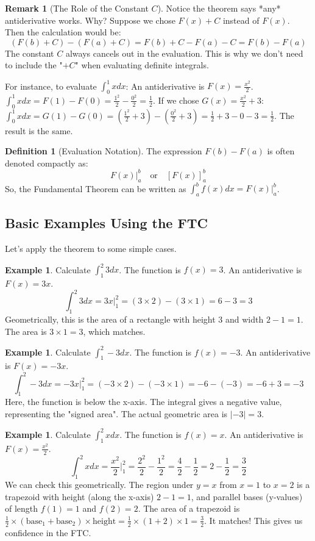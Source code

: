 \documentclass[11pt]{article}
\theoremstyle{definition}
\newtheorem{definition}[theorem]{Definition}
\newtheorem{example}[theorem]{Example}
\newtheorem{remark}[theorem]{Remark}
\theoremstyle{remark} %
\begin{document}
\begin{remark}[The Role of the Constant $C$]
Notice the theorem says *any* antiderivative works. Why? Suppose we chose $F(x) + C$ instead of $F(x)$. Then the calculation would be:
\[
(F(b) + C) - (F(a) + C) = F(b) + C - F(a) - C = F(b) - F(a)
\]
The constant $C$ always cancels out in the evaluation. This is why we don't need to include the "$+ C$" when evaluating definite integrals.

For instance, to evaluate $\int_0^1 x dx$:
An antiderivative is $F(x) = \frac{x^2}{2}$.
$\int_0^1 x dx = F(1) - F(0) = \frac{1^2}{2} - \frac{0^2}{2} = \frac{1}{2}$.
If we chose $G(x) = \frac{x^2}{2} + 3$:
$\int_0^1 x dx = G(1) - G(0) = (\frac{1^2}{2} + 3) - (\frac{0^2}{2} + 3) = \frac{1}{2} + 3 - 0 - 3 = \frac{1}{2}$.
The result is the same.
\end{remark}

\begin{definition}[Evaluation Notation]
The expression $F(b) - F(a)$ is often denoted compactly as:
\[
F(x) \bigg|_a^b \quad \text{or} \quad [F(x)]_a^b
\]
So, the Fundamental Theorem can be written as $\int_a^b f(x) dx = F(x) \big|_a^b$.
\end{definition}

\subsection{Basic Examples Using the FTC}

Let's apply the theorem to some simple cases.

\begin{example}
Calculate $\int_1^2 3 dx$.
The function is $f(x) = 3$. An antiderivative is $F(x) = 3x$.
\[
\int_1^2 3 dx = 3x \bigg|_1^2 = (3 \times 2) - (3 \times 1) = 6 - 3 = 3
\]
Geometrically, this is the area of a rectangle with height 3 and width $2-1=1$. The area is $3 \times 1 = 3$, which matches.
\end{example}

\begin{example}
Calculate $\int_1^2 -3 dx$.
The function is $f(x) = -3$. An antiderivative is $F(x) = -3x$.
\[
\int_1^2 -3 dx = -3x \bigg|_1^2 = (-3 \times 2) - (-3 \times 1) = -6 - (-3) = -6 + 3 = -3
\]
Here, the function is below the x-axis. The integral gives a negative value, representing the "signed area". The actual geometric area is $|-3|=3$.
\end{example}

\begin{example}
Calculate $\int_1^2 x dx$.
The function is $f(x) = x$. An antiderivative is $F(x) = \frac{x^2}{2}$.
\[
\int_1^2 x dx = \frac{x^2}{2} \bigg|_1^2 = \frac{2^2}{2} - \frac{1^2}{2} = \frac{4}{2} - \frac{1}{2} = 2 - \frac{1}{2} = \frac{3}{2}
\]
We can check this geometrically. The region under $y=x$ from $x=1$ to $x=2$ is a trapezoid with height (along the x-axis) $2-1=1$, and parallel bases (y-values) of length $f(1)=1$ and $f(2)=2$. The area of a trapezoid is $\frac{1}{2} \times (\text{base}_1 + \text{base}_2) \times \text{height} = \frac{1}{2} \times (1+2) \times 1 = \frac{3}{2}$. It matches! This gives us confidence in the FTC.
\end{example}
\end{document}
